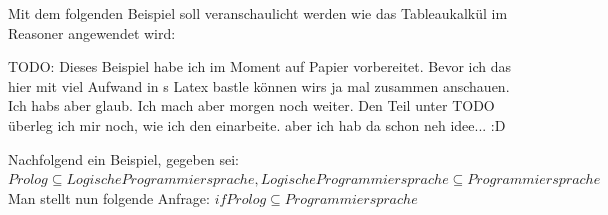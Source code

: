 \begin{table}[H]
\centering
{}\hfill
{}
\end{table}

Mit dem folgenden Beispiel soll veranschaulicht werden wie das Tableaukalkül im Reasoner angewendet wird:

TODO: Dieses Beispiel habe ich im Moment auf Papier vorbereitet. Bevor ich das hier mit viel Aufwand in s Latex bastle können wirs ja mal zusammen anschauen. Ich habs aber glaub. Ich mach aber morgen noch weiter. Den Teil unter TODO überleg ich mir noch, wie ich den einarbeite. aber ich hab da schon neh idee... :D


Nachfolgend ein Beispiel, gegeben sei:
$ Prolog \subseteq LogischeProgrammiersprache, LogischeProgrammiersprache \subseteq Programmiersprache $
Man stellt nun folgende Anfrage:
$ if Prolog \subseteq Programmiersprache $

